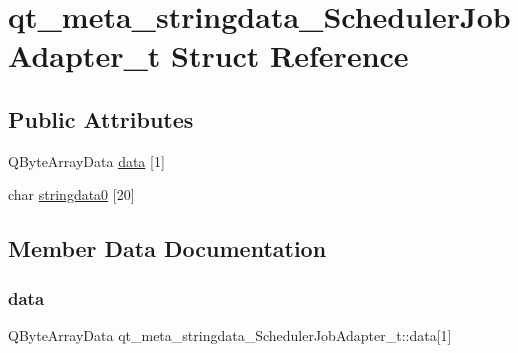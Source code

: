\hypertarget{structqt__meta__stringdata___scheduler_job_adapter__t}{}\section{qt\+\_\+meta\+\_\+stringdata\+\_\+\+Scheduler\+Job\+Adapter\+\_\+t Struct Reference}
\label{structqt__meta__stringdata___scheduler_job_adapter__t}
\subsection*{Public Attributes}
\begin{DoxyCompactItemize}
\item 
Q\+Byte\+Array\+Data \mbox{\hyperlink{structqt__meta__stringdata___scheduler_job_adapter__t_a55bf1ade8c43a44a695c4a66c9a4f4f6}{data}} \mbox{[}1\mbox{]}
\item 
char \mbox{\hyperlink{structqt__meta__stringdata___scheduler_job_adapter__t_aff7b2a046765f3c64839a4843f24acef}{stringdata0}} \mbox{[}20\mbox{]}
\end{DoxyCompactItemize}


\subsection{Member Data Documentation}
\mbox{\label{structqt__meta__stringdata___scheduler_job_adapter__t_a55bf1ade8c43a44a695c4a66c9a4f4f6}} 
\subsubsection{\texorpdfstring{data}{data}}
{\footnotesize\ttfamily Q\+Byte\+Array\+Data qt\+\_\+meta\+\_\+stringdata\+\_\+\+Scheduler\+Job\+Adapter\+\_\+t\+::data\mbox{[}1\mbox{]}}

\mbox{\label{structqt__meta__stringdata___scheduler_job_adapter__t_aff7b2a046765f3c64839a4843f24acef}} 
